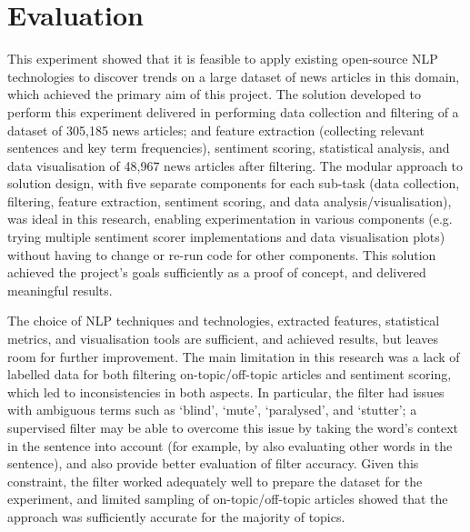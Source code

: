 \documentclass{report}
\begin{document}
\section{Evaluation} \label{Evaluation}

This experiment showed that it is feasible to apply existing open-source NLP technologies to discover trends on a large dataset of news articles in this domain, which achieved the primary aim of this project.
The solution developed to perform this experiment delivered in performing data collection and filtering of a dataset of 305,185 news articles; and feature extraction (collecting relevant sentences and key term frequencies), sentiment scoring, statistical analysis, and data visualisation of 48,967 news articles after filtering.
The modular approach to solution design, with five separate components for each sub-task (data collection, filtering, feature extraction, sentiment scoring, and data analysis/visualisation), was ideal in this research, enabling experimentation in various components (e.g. trying multiple sentiment scorer implementations and data visualisation plots) without having to change or re-run code for other components.
This solution achieved the project's goals sufficiently as a proof of concept, and delivered meaningful results.

The choice of NLP techniques and technologies, extracted features, statistical metrics, and visualisation tools are sufficient, and achieved results, but leaves room for further improvement.
The main limitation in this research was a lack of labelled data for both filtering on-topic/off-topic articles and sentiment scoring, which led to inconsistencies in both aspects.
In particular, the filter had issues with ambiguous terms such as `blind', `mute', `paralysed', and `stutter'; a supervised filter may be able to overcome this issue by taking the word's context in the sentence into account (for example, by also evaluating other words in the sentence), and also provide better evaluation of filter accuracy. 
Given this constraint, the filter worked adequately well to prepare the dataset for the experiment, and limited sampling of on-topic/off-topic articles showed that the approach was sufficiently accurate for the majority of topics.
\end{document}
